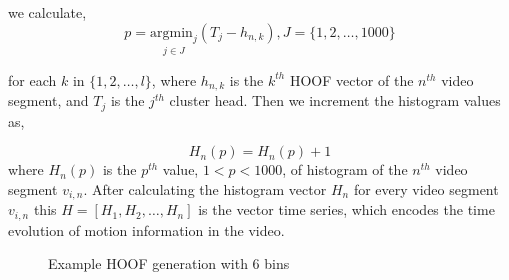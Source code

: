 we calculate,
\begin{equation}
p = \underset{j\in J}{\mathrm{argmin}_{j}}(T_{j}-h_{n,k}), J=\{1,2,\dots,1000\}
\end{equation}

for each $k$ in $\{1,2,\dots, l\}$, where $h_{n,k}$ is the $k^{th}$ HOOF vector of the $n^{th}$ video segment, and $T_{j}$ is the $j^{th}$ cluster head. Then we increment the histogram values as,

\begin{equation}
H_{n}(p) = H_{n}(p)+1
\end{equation}
where $H_{n}(p)$ is the $p^{th}$ value, $1<p<1000$, of histogram of the $n^{th}$ video segment $v_{i,n}$. After calculating the histogram vector $H_{n}$ for every video segment $v_{i,n}$
this $H = [H_{1},H_{2}, \dots, H_{n}]$ is the vector time series, which encodes the time evolution of motion information in the video.

\begin{figure}
  \centering
  
  \caption{Example HOOF generation with 6 bins}\label{fi:hoof}
\end{figure}
